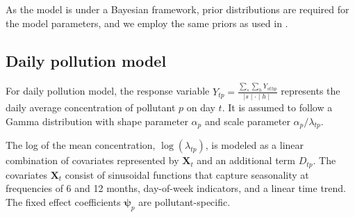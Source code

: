 \documentclass[
  12,
]{article}
\begin{document}
As the model is under a Bayesian framework, prior distributions are
required for the model parameters, and we employ the same priors as used
in \textcite{Huang2022}.

\hypertarget{daily-pollution-model}{%
\subsection{Daily pollution model}\label{daily-pollution-model}}

For daily pollution model, the response variable
\(Y_{tp}=\frac{\sum_s\sum_h Y_{sthp}}{\mid s \mid \cdot \mid h \mid}\)
represents the daily average concentration of pollutant \(p\) on day
\(t\). It is assumed to follow a Gamma distribution with shape parameter
\(\alpha_p\) and scale parameter \(\alpha_p/\lambda_{tp}\).

The log of the mean concentration, \(\log(\lambda_{tp})\), is modeled as
a linear combination of covariates represented by \(\mathbf{X}_t\) and an
additional term \(D_{tp}\). The covariates \(\mathbf{X}_t\) consist of
sinusoidal functions that capture seasonality at frequencies of 6 and 12
months, day-of-week indicators, and a linear time trend. The fixed
effect coefficients \(\mathbf{\psi}_p\) are pollutant-specific.
\end{document}
